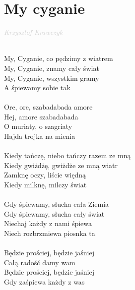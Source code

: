 \documentclass[a5paper, 10pt]{book}
\begin{document}
\newpage
\section{My cyganie}\textcolor{lightgray}{\textit{Krzysztof Krawczyk}}\\~\\
\begin{minipage}[t]{0.7\textwidth}
My, Cyganie, co pędzimy z wiatrem\\
My, Cyganie, znamy cały świat\\
My, Cyganie, wszystkim gramy\\
A śpiewamy sobie tak\\
\\
\hspace*{6mm}Ore, ore, szabadabada amore\\
\hspace*{6mm}Hej, amore szabadabada\\
\hspace*{6mm}O muriaty, o szagriaty\\
\hspace*{6mm}Hajda trojka na mienia\\
\\
Kiedy tańczę, niebo tańczy razem ze mną\\
Kiedy gwiżdżę, gwiżdże ze mną wiatr\\
Zamknę oczy, liście więdną\\
Kiedy milknę, milczy świat\\
\\
Gdy śpiewamy, słucha cała Ziemia\\
Gdy śpiewamy, słucha cały świat\\
Niechaj każdy z nami śpiewa\\
Niech rozbrzmiewa piosnka ta\\
\\
Będzie prościej, będzie jaśniej\\
Całą radość damy wam\\
Będzie prościej, będzie jaśniej\\
Gdy zaśpiewa każdy z was\\
\end{minipage}
\end{document}
